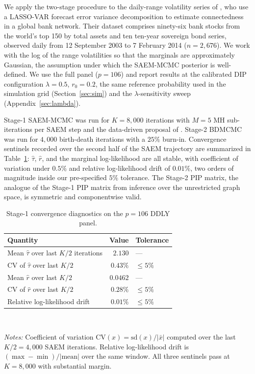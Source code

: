 We apply the two-stage procedure to the daily-range volatility series of \textcite{demirer2018estimating}, who use a LASSO-VAR forecast error variance decomposition to estimate connectedness in a global bank network. Their dataset comprises ninety-six bank stocks from the world's top 150 by total assets and ten ten-year sovereign bond series, observed daily from 12 September 2003 to 7 February 2014 ($n = 2{,}676$). We work with the log of the range volatilities so that the marginals are approximately Gaussian, the assumption under which the SAEM-MCMC posterior is well-defined. We use the full panel ($p = 106$) and report results at the calibrated DIP configuration $\lambda = 0.5$, $r_0 = 0.2$, the same reference probability used in the simulation grid (Section~\ref{sec:sim}) and the $\lambda$-sensitivity sweep (Appendix~\ref{sec:lambda}).

Stage-1 SAEM-MCMC was run for $K = 8{,}000$ iterations with $M = 5$ MH sub-iterations per SAEM step and the data-driven proposal of \textcite{donnet2012empirical}. Stage-2 BDMCMC was run for $4{,}000$ birth-death iterations with a $25\%$ burn-in. Convergence sentinels recorded over the second half of the SAEM trajectory are summarized in Table~\ref{tab:ddly-diag}: $\hat\tau$, $\hat r$, and the marginal log-likelihood are all stable, with coefficient of variation under $0.5\%$ and relative log-likelihood drift of $0.01\%$, two orders of magnitude inside our pre-specified $5\%$ tolerance. The Stage-2 PIP matrix, the analogue of the Stage-1 PIP matrix from inference over the unrestricted graph space, is symmetric and componentwise valid.

\begin{table}[H]
    \centering
    \caption{Stage-1 convergence diagnostics on the $p = 106$ DDLY panel.}
    \label{tab:ddly-diag}
    \begin{tabular}{lrl}
        \toprule
        Quantity & Value & Tolerance \\
        \midrule
        Mean $\hat\tau$ over last $K/2$ iterations  & $2.130$  & --- \\
        CV of $\hat\tau$ over last $K/2$            & $0.43\%$ & $\le 5\%$ \\
        Mean $\hat r$ over last $K/2$               & $0.0462$ & --- \\
        CV of $\hat r$ over last $K/2$              & $0.28\%$ & $\le 5\%$ \\
        Relative log-likelihood drift               & $0.01\%$ & $\le 5\%$ \\
        \bottomrule
    \end{tabular}
    \\[0.4em]
    \begin{minipage}{0.85\linewidth}
        \footnotesize
        \emph{Notes:} Coefficient of variation $\text{CV}(x) = \mathrm{sd}(x)/|\bar{x}|$ computed over the last $K/2 = 4{,}000$ SAEM iterations. Relative log-likelihood drift is $(\max - \min) / |\text{mean}|$ over the same window. All three sentinels pass at $K = 8{,}000$ with substantial margin.
    \end{minipage}
\end{table}

